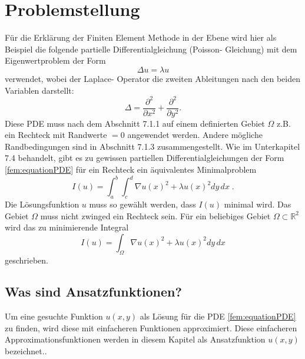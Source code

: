 %
%
%
\section{Problemstellung
\label{fem:section:problemstellung}}
Für die Erklärung der Finiten Element Methode in der Ebene wird hier als Beispiel die folgende partielle Differentialgleichung (Poisson- Gleichung) mit dem Eigenwertproblem der Form 
\begin{equation}
	\Delta u = \lambda u
	\label{fem:equationPDE}
\end{equation}
verwendet, wobei der Laplace- Operator die zweiten Ableitungen nach den beiden Variablen darstellt:
\begin{equation}
	\Delta = \frac{\partial ^2}{\partial x^2} + \frac{\partial ^2}{\partial y^2}.
\end{equation} 
Diese PDE muss nach dem Abschnitt 7.1.1 auf einem definierten Gebiet $\Omega$  z.B. ein Rechteck mit Randwerte $= 0$ angewendet werden. Andere mögliche Randbedingungen sind in Abschnitt 7.1.3 zusammengestellt. Wie im Unterkapitel 7.4 behandelt, gibt es zu gewissen partiellen Differentialgleichungen der Form \eqref{fem:equationPDE} für ein Rechteck ein äquivalentes Minimalproblem
\begin{equation}
	I(u) = \int_a^b \int_c^d \nabla u(x)^2 + \lambda u(x)^2 dy \, dx \; .
	\label{fem:equationMinimalKapt7}
\end{equation}
Die Lösungsfunktion $u$ muss so gewählt werden, dass $I(u)$ minimal wird. Das Gebiet $\Omega$ muss nicht zwinged ein Rechteck sein. Für ein beliebiges Gebiet $\Omega \subset \mathbb{R}^2$ wird das zu minimierende Integral  %
\begin{equation}
	I(u) = \int_{\Omega} \nabla u(x)^2 + \lambda u(x)^2 dy \, dx
	\label{fem:equationMinimalKapt7Alg}
\end{equation}
geschrieben.
\subsection{Was sind Ansatzfunktionen?}
Um eine gesuchte Funktion $u(x,y)$ als Lösung für die PDE \eqref{fem:equationPDE} zu finden, wird diese mit einfacheren Funktionen approximiert. Diese einfacheren Approximationsfunktionen werden in diesem Kapitel als Ansatzfunktion $u(x,y)$ bezeichnet..


